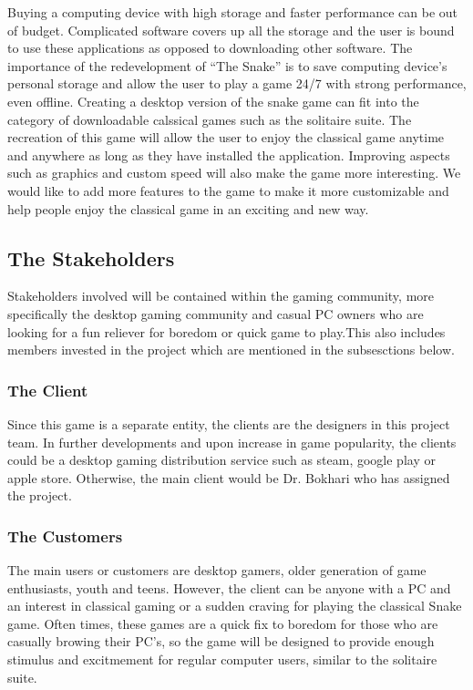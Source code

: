 \documentclass[12pt, titlepage]{article}
\begin{document}
Buying a computing device with high storage and faster performance can be out of budget. Complicated software covers up all the storage and the user is bound to use these applications as opposed to downloading other software. The importance of the redevelopment of “The Snake” is to save computing device’s personal storage and allow the user to play a game 24/7 with strong performance, even offline. Creating a desktop version of the snake game can fit into the category of downloadable calssical games such as the solitaire suite. The recreation of this game will allow the user to enjoy the classical game anytime and anywhere as long as they have installed the application. Improving aspects such as graphics and custom speed will also make the game more interesting. We would like to add more features to the game to make it more customizable and help people enjoy the classical game in an exciting and new way. 

\subsection{The Stakeholders}

Stakeholders involved will be contained within the gaming community, more specifically the desktop gaming community and casual PC owners who are 
looking for a fun reliever for boredom or quick game to play.This also includes members invested in the project which are mentioned in the subsesctions below.

\subsubsection{The Client}

Since this game is a separate entity, the clients are the designers in this project team. In further developments and upon increase in game popularity, the clients 
could be a desktop gaming distribution service such as steam, google play or apple store. Otherwise, the main client would be Dr. Bokhari who has assigned the project.

\subsubsection{The Customers}

The main users or customers  are desktop gamers, older generation of game enthusiasts, youth and teens. However, the client can be anyone with a PC and an interest in classical gaming or a sudden craving for playing the classical Snake game. Often times, these games are a quick fix to boredom for those who are casually browing their PC's, so the game will be designed to provide enough stimulus and excitmement for regular computer users, similar to the solitaire suite.
\end{document}
